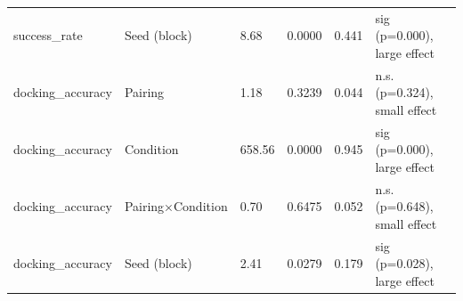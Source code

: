 \begin{tabular}{llllll}
success\_rate & Seed (block) & 8.68 & 0.0000 & 0.441 & sig (p=0.000), large effect \\
docking\_accuracy & Pairing & 1.18 & 0.3239 & 0.044 & n.s. (p=0.324), small effect \\
docking\_accuracy & Condition & 658.56 & 0.0000 & 0.945 & sig (p=0.000), large effect \\
docking\_accuracy & Pairing×Condition & 0.70 & 0.6475 & 0.052 & n.s. (p=0.648), small effect \\
docking\_accuracy & Seed (block) & 2.41 & 0.0279 & 0.179 & sig (p=0.028), large effect \\
\bottomrule
\end{tabular}
